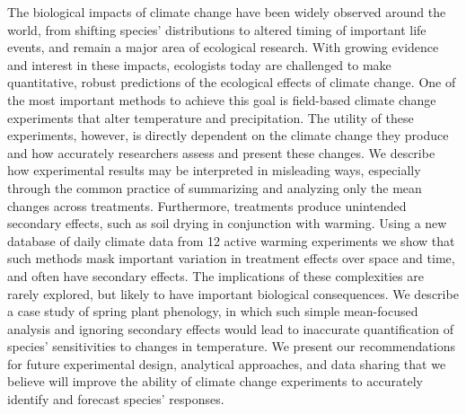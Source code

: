 \documentclass[11pt,a4paper]{letter}
\begin{document}
\begin{letter}{}
The biological impacts of climate change have been widely observed around the world, from shifting species' distributions to altered timing of important life events, and remain a major area of ecological research. With growing evidence and interest in these impacts, ecologists today are challenged to make quantitative, robust predictions of the ecological effects of climate change. One of the most important methods to achieve this goal is field-based climate change experiments that alter temperature and precipitation. The utility of these experiments, however, is directly dependent on the climate change they produce and how accurately researchers assess and present these changes. We describe how experimental results may be interpreted in misleading ways, especially through the common practice of summarizing and analyzing only the mean changes across treatments. Furthermore, treatments produce unintended secondary effects, such as soil drying in conjunction with warming. Using a new database of daily climate data from 12 active warming experiments we show that such methods mask important variation in treatment effects over space and time, and often have secondary effects. The implications of these complexities are rarely explored, but likely to have important biological consequences. We describe a case study of spring plant phenology, in which such simple mean-focused analysis and ignoring secondary effects would lead to inaccurate quantification of species' sensitivities to changes in temperature. We present our recommendations for future experimental design, analytical approaches, and data sharing that we believe will improve the ability of climate change experiments to accurately identify and forecast species' responses.




\end{letter}
\end{document}
